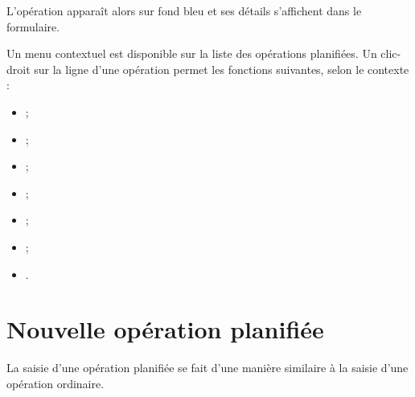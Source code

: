 L'opération apparaît alors sur fond bleu{\couleur} et ses détails s'affichent dans le formulaire.

Un menu contextuel est disponible sur la liste des opérations planifiées. Un clic-droit sur la ligne d'une opération permet les fonctions suivantes, selon le contexte :

\begin{itemize}
	\ifIllustration
	\label{planned-transactions-context-img}
	\fi
	 \item {} ;
	 \item {} ;
	 \item {} ;
	 \item {} ;
	 \item {} ;
	 \item {} ;	 
	 \item {}.
\end{itemize}

\ifIllustration
\fi


\section{Nouvelle opération planifiée\label{plannedtransactions-new}}


La saisie d'une opération planifiée se fait d'une manière similaire à la saisie d'une opération ordinaire.


